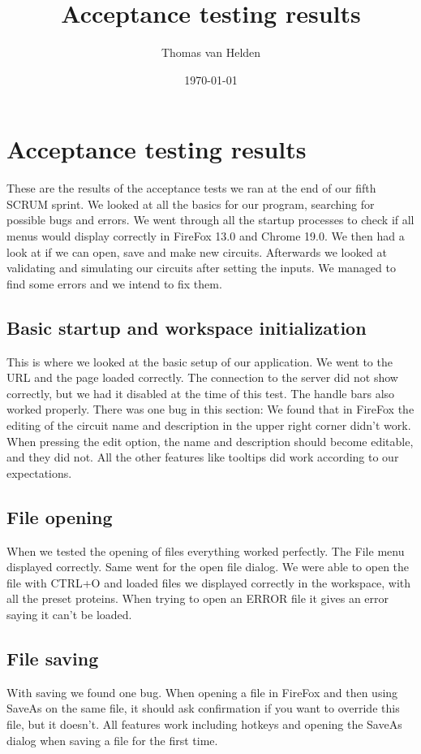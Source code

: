 \documentclass{article}
\begin{document}
\title{Acceptance testing results}
\author{Thomas van Helden}
\date{\today}
\maketitle



\section{Acceptance testing results}
These are the results of the acceptance tests we ran at the end of our fifth SCRUM sprint. We looked at all the basics for our program, searching for possible bugs and errors. We went through all the startup processes to check if all menus would display correctly in FireFox 13.0 and Chrome 19.0. We then had a look at if we can open, save and make new circuits. Afterwards we looked at validating and simulating our circuits after setting the inputs. We managed to find some errors and we intend to fix them.

\subsection{Basic startup and workspace initialization}
This is where we looked at the basic setup  of our application. We went to the URL and the page loaded correctly. The connection to the server did not show correctly, but we had it disabled at the time of this test. The handle bars also worked properly. There was one bug in this section: We found that in FireFox the editing of the circuit name and description in the upper right corner didn't work. When pressing the edit option, the name and description should become editable, and they did not.
All the other features like tooltips did work according to our expectations.

\subsection{File opening}
When we tested the opening of files everything worked perfectly. The File menu displayed correctly. Same went for the open file dialog. We were able to open the file with CTRL+O and loaded files we displayed correctly in the workspace, with all the preset proteins.
When trying to open an ERROR file it gives an error saying it can't be loaded.

\subsection{File saving}
With saving we found one bug. When opening a file in FireFox and then using SaveAs on the same file, it should ask confirmation if you want to override this file, but it doesn't. All features work including hotkeys and opening the SaveAs dialog when saving a file for the first time.
\end{document}
